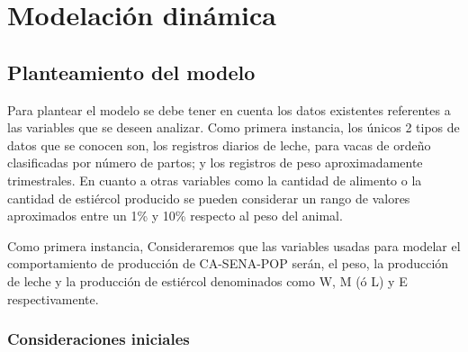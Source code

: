 \section{Modelación dinámica} \label{dinamod}
\subsection{Planteamiento del modelo}

Para plantear el modelo se debe tener en cuenta los datos existentes referentes a las variables que se deseen analizar. Como primera instancia, los únicos 2 tipos de datos que se conocen son, los registros diarios de leche, para vacas de ordeño clasificadas por número de partos; y los registros de peso aproximadamente trimestrales. En cuanto a otras variables como la cantidad de alimento o la cantidad de estiércol producido se pueden considerar un rango de valores aproximados entre un 1\% y 10\% respecto al peso del animal.

Como primera instancia, Consideraremos que las variables usadas para modelar el comportamiento de producción de CA-SENA-POP serán, el peso, la producción de leche y la producción de estiércol denominados como W, M (ó L) y E respectivamente.

\subsubsection{Consideraciones iniciales}

